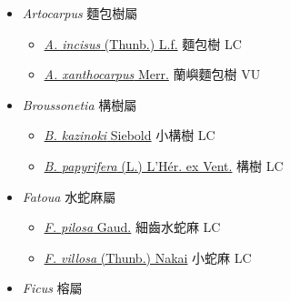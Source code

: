 
  \begin{itemize}
 \item[] \textit{Artocarpus} 麵包樹屬
                    
  \begin{itemize}
        \item[] \href{http://www.theplantlist.org/tpl1.1/search?q=Artocarpus+incisus}{\textit{A. incisus} (Thunb.) L.f.}   麵包樹 LC
        \item[] \href{http://www.theplantlist.org/tpl1.1/search?q=Artocarpus+xanthocarpus}{\textit{A. xanthocarpus} Merr.}   蘭嶼麵包樹 VU
  \end{itemize}
 \item[] \textit{Broussonetia} 構樹屬
                    
  \begin{itemize}
        \item[] \href{http://www.theplantlist.org/tpl1.1/search?q=Broussonetia+kazinoki}{\textit{B. kazinoki} Siebold}   小構樹 LC
        \item[] \href{http://www.theplantlist.org/tpl1.1/search?q=Broussonetia+papyrifera}{\textit{B. papyrifera} (L.) L'Hér. ex Vent.}   構樹 LC
  \end{itemize}
 \item[] \textit{Fatoua} 水蛇麻屬
                    
  \begin{itemize}
        \item[] \href{http://www.theplantlist.org/tpl1.1/search?q=Fatoua+pilosa}{\textit{F. pilosa} Gaud.}   細齒水蛇麻 LC
        \item[] \href{http://www.theplantlist.org/tpl1.1/search?q=Fatoua+villosa}{\textit{F. villosa} (Thunb.) Nakai}   小蛇麻 LC
  \end{itemize}
 \item[] \textit{Ficus} 榕屬
                    

\end{itemize}
